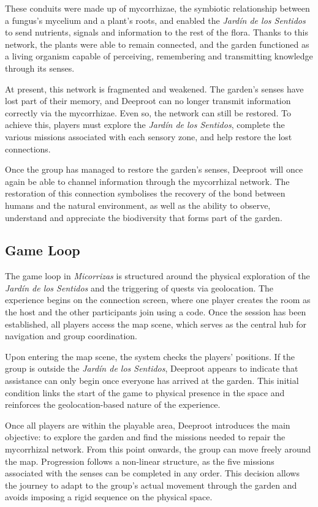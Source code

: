 These conduits were made up of mycorrhizae, the symbiotic relationship between a fungus’s mycelium and a plant’s roots, and enabled the \textit{Jardín de los Sentidos} to send nutrients, signals and information to the rest of the flora. Thanks to this network, the plants were able to remain connected, and the garden functioned as a living organism capable of perceiving, remembering and transmitting knowledge through its senses.

At present, this network is fragmented and weakened. The garden’s senses have lost part of their memory, and Deeproot can no longer transmit information correctly via the mycorrhizae. Even so, the network can still be restored. To achieve this, players must explore the \textit{Jardín de los Sentidos}, complete the various missions associated with each sensory zone, and help restore the lost connections.

Once the group has managed to restore the garden’s senses, Deeproot will once again be able to channel information through the mycorrhizal network. The restoration of this connection symbolises the recovery of the bond between humans and the natural environment, as well as the ability to observe, understand and appreciate the biodiversity that forms part of the garden.


\subsection{Game Loop}
The game loop in \textit{Micorrizas} is structured around the physical exploration of the \textit{Jardín de los Sentidos} and the triggering of quests via geolocation. The experience begins on the connection screen, where one player creates the room as the host and the other participants join using a code. Once the session has been established, all players access the map scene, which serves as the central hub for navigation and group coordination.

Upon entering the map scene, the system checks the players’ positions. If the group is outside the \textit{Jardín de los Sentidos}, Deeproot appears to indicate that assistance can only begin once everyone has arrived at the garden. This initial condition links the start of the game to physical presence in the space and reinforces the geolocation-based nature of the experience.

Once all players are within the playable area, Deeproot introduces the main objective: to explore the garden and find the missions needed to repair the mycorrhizal network. From this point onwards, the group can move freely around the map. Progression follows a non-linear structure, as the five missions associated with the senses can be completed in any order. This decision allows the journey to adapt to the group’s actual movement through the garden and avoids imposing a rigid sequence on the physical space.

